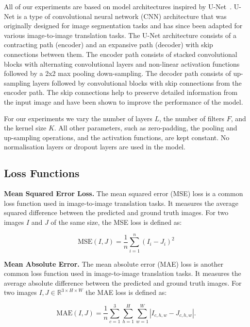 All of our experiments are based on model architectures inspired by U-Net~\cite{unet}. U-Net is a type of convolutional neural network (CNN) architecture that was originally designed for image segmentation tasks and has since been adapted for various image-to-image translation tasks. The U-Net architecture consists of a contracting path (encoder) and an expansive path (decoder) with skip connections between them. The encoder path consists of stacked convolutional blocks with alternating convolutional layers and non-linear activation functions followed by a 2x2 max pooling down-sampling. The decoder path consists of up-sampling layers followed by convolutional blocks with skip connections from the encoder path. The skip connections help to preserve detailed information from the input image and have been shown to improve the performance of the model. 

For our experiments we vary the number of layers $L$, the number of filters $F$, and the kernel size $K$. All other parameters, such as zero-padding, the pooling and up-sampling operations, and the activation functions, are kept constant. No normalisation layers or dropout layers are used in the model.

\subsection{Loss Functions}
\label{subsec:loss-functions}

\textbf{Mean Squared Error Loss.} The mean squared error (MSE) loss is a common loss function used in image-to-image translation tasks. It measures the average squared difference between the predicted and ground truth images. For two images $I$ and $J$ of the same size, the MSE loss is defined as:

\begin{equation}
    \text{MSE}(I, J) = \frac{1}{n} \sum_{i=1}^{n} (I_i - J_i)^2
    \label{eq:mse}
\end{equation}

\textbf{Mean Absolute Error.} The mean absolute error (MAE) loss is another common loss function used in image-to-image translation tasks. It measures the average absolute difference between the predicted and ground truth images. For two images $I, J \in \mathbb{R}^{3 \times H \times W}$ the MAE loss is defined as:

\begin{equation}
    \text{MAE}(I, J) = \frac{1}{n} \sum_{c=1}^{3}\sum_{h=1}^{H} \sum_{w=1}^{W} |I_{c,h,w} - J_{c,h,w}|.
    \label{eq:mae}
\end{equation}

